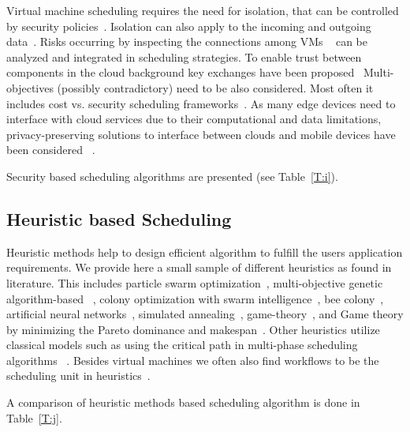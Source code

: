 \documentclass[final,5p,times,twocolumn]{elsarticle}
\begin{document}
Virtual machine scheduling requires the need for isolation, that can
be controlled by security
policies~\cite{afoulki2011security}. Isolation can also apply to the
incoming and outgoing data~\cite{chejerla2017qos,kashyap2014security}.
Risks occurring by inspecting the connections among VMs
~\cite{shetty2016security} can be analyzed and integrated in
scheduling strategies.  To enable trust between components in the
cloud background key exchanges have been proposed~\cite{liu2013ccbke}
Multi-objectives (possibly contradictory) need to be also
considered. Most often it includes cost vs. security scheduling
frameworks~\cite{kashyap2014security,zeng2015saba,wang2012cloud}.  As
many edge devices need to interface with cloud services due to their
computational and data limitations, privacy-preserving solutions to
interface between clouds and mobile devices have been considered
~\cite{bilogrevic2011meetings}.

Security based scheduling algorithms are presented (see
Table~\ref{T:i}). 





\subsection{Heuristic based Scheduling}\label{sec:heuristic}



Heuristic methods help to design efficient algorithm to fulfill the
users application requirements. We provide here a small sample of
different heuristics as found in literature. This includes particle
swarm optimization~\cite{pandey2010particle}, multi-objective genetic
algorithm-based ~\cite{mezmaz2011parallel,gkasior2016metaheuristic},
colony optimization with swarm intelligence~\cite{mateos2013aco}, bee
colony~\cite{ld2013honey}, artificial neural
networks~\cite{kousiouris2011effects}, simulated
annealing~\cite{torabzadeh2010cloud},
game-theory~\cite{gkasior2016metaheuristic}, and Game theory by
minimizing the Pareto dominance and makespan~\cite{su2013cost}.  Other
heuristics utilize classical models such as using the critical path in
multi-phase scheduling algorithms ~\cite
{abrishami2013deadline}. Besides virtual machines we often also find
workflows to be the scheduling unit in
heuristics~\cite{bousselmi2016qos}.

A comparison of heuristic methods based scheduling
algorithm is done in Table~\ref{T:j}.
\end{document}
